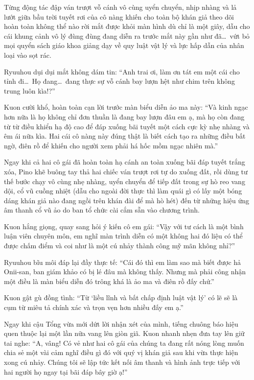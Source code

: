 \documentclass[../main.tex]{subfiles}
\begin{document}
Từng động tác đập ván trượt vỗ cánh vô cùng uyển chuyển, nhịp nhàng và lả lướt giữa bầu trời tuyết rơi của cô nàng khiến cho toàn bộ khán giả theo dõi hoàn toàn không thể nào rời mắt được khỏi màn hình dù chỉ là một giây, dẫu cho cái khung cảnh vô lý đùng đùng đang diễn ra trước mắt này gần như đã\dots\ vứt bỏ mọi quyển sách giáo khoa giảng dạy về quy luật vật lý và lực hấp dẫn của nhân loại vào sọt rác.

Ryuuhou dụi dụi mắt không dám tin: ``Anh trai ơi, làm ơn tát em một cái cho tỉnh đi\dots\ Họ đang\dots\ đang thực sự vỗ cánh bay lượn hệt như chim trên không trung luôn kìa!?''

Kuon cười khổ, hoàn toàn cạn lời trước màn biểu diễn ảo ma này: ``Và kinh ngạc hơn nữa là họ không chỉ đơn thuần là đang bay lượn đâu em ạ, mà họ còn đang từ từ điều khiển hạ độ cao để đáp xuống bãi tuyết một cách cực kỳ nhẹ nhàng và êm ái nữa kìa. Hai cái cô nàng này đúng thật là biết cách tạo ra những điều bất ngờ, điên rồ để khiến cho người xem phải há hốc mồm ngạc nhiên mà.''

Ngay khi cả hai cô gái đã hoàn toàn hạ cánh an toàn xuống bãi đáp tuyết trắng xóa, Pino khẽ buông tay thả hai chiếc ván trượt rơi tự do xuống đất, rồi dùng tư thế bước chạy vô cùng nhẹ nhàng, uyển chuyển để tiếp đất trong sự hò reo vang dội, cổ vũ cuồng nhiệt (dẫu cho ngoài đời thực thì làm quái gì có lấy một bóng dáng khán giả nào đang ngồi trên khán đài để mà hò hét) đến từ những hiệu ứng âm thanh cổ vũ ảo do ban tổ chức cài cắm sẵn vào chương trình.

Kuon hắng giọng, quay sang hỏi ý kiến cô em gái: ``Vậy với tư cách là một bình luận viên chuyên môn, em nghĩ màn trình diễn có một không hai đó liệu có thể được chấm điểm và coi như là một cú nhảy thành công mỹ mãn không nhỉ?''

Ryuuhou bĩu môi đáp lại đầy thực tế: ``Cái đó thì em làm sao mà biết được hả Onii-san, ban giám khảo có bị lé đâu mà không thấy. Nhưng mà phải công nhận một điều là màn biểu diễn đó trông khá là ảo ma và điên rồ đấy chứ.''

Kuon gật gù đồng tình: ``Từ `liều lĩnh và bất chấp định luật vật lý' có lẽ sẽ là cụm từ miêu tả chính xác và trọn vẹn hơn nhiều đấy em ạ.''

Ngay khi cậu Tổng vừa mới dứt lời nhận xét của mình, tiếng chuông báo hiệu quen thuộc lại một lần nữa vang lên giòn giã. Kuon nhanh nhẹn đưa tay lên giữ tai nghe: ``A, vâng! Có vẻ như hai cô gái của chúng ta đang rất nóng lòng muốn chia sẻ một vài cảm nghĩ điều gì đó với quý vị khán giả sau khi vừa thực hiện xong cú nhảy. Chúng tôi sẽ lập tức kết nối âm thanh và hình ảnh trực tiếp với hai người họ ngay tại bãi đáp bây giờ ạ!''
\end{document}
